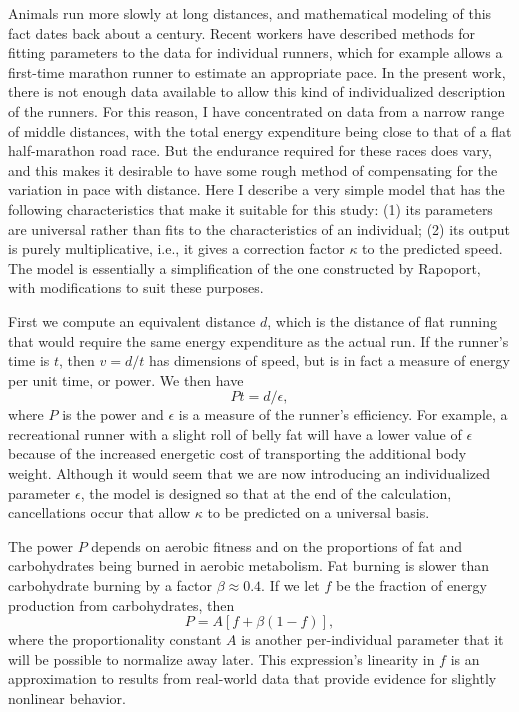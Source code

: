 \documentclass[10pt,letterpaper]{article}
\begin{document}
Animals run more slowly at long distances, and mathematical modeling of this fact dates back
about a century.\cite{hill}  Recent workers have described methods for fitting parameters
to the data for individual runners,\cite{rapoport}\cite{emig} which for example allows
a first-time marathon runner to estimate an appropriate pace. In the present work, there is
not enough data available to allow this kind of individualized description of the runners.
For this reason, I have concentrated on data from a narrow range of middle distances,
with the total energy expenditure being close to that of a flat half-marathon road race.
But the endurance required for these races does vary, and this makes it desirable to have
some rough method of compensating for the variation in pace with distance. Here I describe
a very simple model that has the following characteristics that make it suitable for this
study: (1) its parameters are universal rather than fits to the characteristics of an individual;
(2) its output is purely multiplicative, i.e., it gives a correction factor $\kappa$ to the predicted speed.
The model is essentially a simplification of the one constructed by Rapoport,\cite{rapoport} with modifications
to suit these purposes.

First we compute an equivalent distance $d$, which is the distance of flat running that would
require the same energy expenditure as the actual run. If the runner's time is $t$, then
$v=d/t$ has dimensions of speed, but is in fact a measure of energy per unit time, or power.
We then have
\begin{equation}\label{eq:fuel-model-1}
  Pt=d/\epsilon,
\end{equation}
where $P$ is the power and $\epsilon$ is a measure of the runner's efficiency. For example,
a recreational runner with a slight roll of belly fat will have a lower value of $\epsilon$ because of
the increased energetic cost of transporting the additional body weight. Although it would seem that
we are now introducing an individualized parameter $\epsilon$, the model is designed so that at the
end of the calculation, cancellations occur that allow $\kappa$ to be predicted on a universal basis.

The power $P$ depends on aerobic fitness and on the proportions of fat and carbohydrates being
burned in aerobic metabolism. Fat burning is slower than carbohydrate burning by a factor $\beta\approx 0.4$.\cite{rapoport}
If we let $f$ be the fraction of energy production from carbohydrates, then
\begin{equation}\label{eq:fuel-model-2}
  P = A[f+\beta(1-f)],
\end{equation}
where the proportionality constant $A$ is another per-individual parameter that it will be
possible to normalize away later. This expression's linearity in $f$ is an approximation to
results from real-world data that provide evidence for slightly nonlinear behavior.\cite{rapoport}
\end{document}
